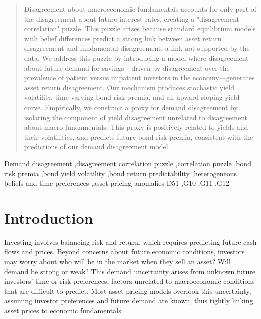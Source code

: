 \documentclass[preprint,11pt,authoryear]{elsarticle}
\theoremstyle{plain}
\begin{document}
\begin{frontmatter}
\begin{abstract}
Disagreement about macroeconomic fundamentals accounts for only part of the disagreement about future interest rates, creating a "disagreement correlation" puzzle. This puzzle arises because standard equilibrium models with belief differences predict a strong link between asset return disagreement and fundamental disagreement, a link not supported by the data. We address this puzzle by introducing a model where disagreement about future demand for savings—driven by disagreement over the prevalence of patient versus impatient investors in the economy—generates asset return disagreement. Our mechanism produces stochastic yield volatility, time-varying bond risk premia, and an upward-sloping yield curve. Empirically, we construct a proxy for demand disagreement by isolating the component of yield disagreement unrelated to disagreement about macro-fundamentals. This proxy is positively related to yields and their volatilities, and predicts future bond risk premia, consistent with the predictions of our demand disagreement model.
\end{abstract}

\begin{keyword}
Demand disagreement \sep disagreement correlation puzzle \sep correlation puzzle \sep bond risk premia \sep bond yield volatility \sep bond return predictability \sep heterogeneous beliefs and time preferences \sep asset pricing anomalies
\JEL D51 \sep G10 \sep G11 \sep G12
\end{keyword}

\end{frontmatter}

\section{Introduction}


Investing involves balancing risk and return, which requires predicting future cash flows and prices. Beyond concerns about future economic conditions, investors may worry about who will be in the market when they sell an asset? Will demand be strong or weak? This demand uncertainty arises from unknown future investors' time or risk preferences, factors unrelated to macroeconomic conditions that are difficult to predict. Most asset pricing models overlook this uncertainty, assuming investor preferences and future demand are known, thus tightly linking asset prices to economic fundamentals. %
\end{document}
